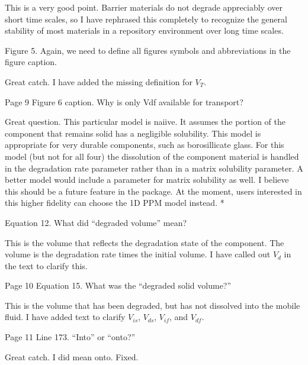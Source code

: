 \documentclass[answers,12pt]{exam}
\begin{document}
\begin{questions}
\begin{solution}
This is a very good point. Barrier materials do not degrade appreciably over 
short time scales, so I 
have rephrased this completely to recognize the general 
stability of most materials in a repository environment over long time scales. 
\end{solution}

\question Figure 5. Again, we need to define all figures symbols and abbreviations in the figure caption.
\begin{solution}
Great catch. I have added the missing definition for $V_T$. 
\end{solution}

\question Page 9 Figure 6 caption. Why is only Vdf available for transport?
\begin{solution}
Great question. This particular model is naiive. It assumes the portion of the 
        component that remains solid  has a negligible solubility. This model 
        is appropriate for very durable components, such as borosillicate 
        glass.  For this model (but not for all four) the dissolution of the 
        component material is handled in the degradation rate parameter rather 
        than in a matrix solubility parameter. A better model would include a 
        parameter for matrix solubility as well. I believe this should be a 
        future feature in the package. At the moment, users interested in this 
        higher fidelity can choose the 1D PPM model instead. 
        {\color{red}*}
\end{solution}

\question Equation 12. What did ``degraded volume'' mean?
\begin{solution}
This is the volume that reflects the degradation state of the component. The 
        volume is the degradation rate times the initial volume. I have called 
        out $V_d$ in the text to clarify this.
\end{solution}

\question Page 10 Equation 15. What was the ``degraded solid volume?''
\begin{solution}
        This is the volume that has been degraded, but has not dissolved into 
        the mobile fluid. I have 
        added text to clarify
        $V_{is}$,  
        $V_{ds}$, 
        $V_{if}$, and
        $V_{df}$. 
\end{solution}
 

\question Page 11 Line 173. ``Into'' or ``onto?''
\begin{solution}
Great catch. I did mean onto. Fixed.
\end{solution}


\end{questions}
\end{document}
